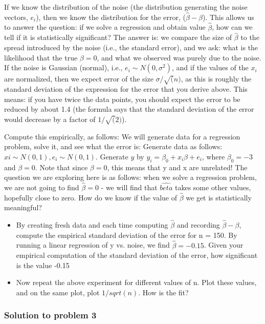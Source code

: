 \documentclass[12pt]{article}%
\begin{document}
If we know the distribution of the noise (the distribution generating the noise vectors, $e_i$), then we know the distribution for the error, ($\hat{\beta} - \beta$). This allows us to answer the question: if we solve a regression and obtain value $\hat{\beta}$, how can we tell if it is statistically significant? The answer is: we compare the size of $\hat{\beta}$ to the spread introduced by the noise (i.e., the standard error), and we ask: what is the likelihood that the true $\beta = 0$, and what we observed was purely due to the noise.\\

If the noise is Gaussian (normal), i.e., $e_i \sim N(0, \sigma^2)$, and if the values of the $x_i$ are normalized, then we expect error of the size $\sigma/\sqrt(n)$, as this is roughly the standard deviation of the expression for the error that you derive above. This means: if you have twice the data points, you should expect the error to be reduced by about 1.4 (the formula says that the standard deviation of the error would decrease by a factor of $1/\sqrt(2)$).

Compute this empirically, as follows: We will generate data for a regression problem, solve it, and see what the error is: Generate data as follows: $xi \sim N(0, 1), e_i \sim N(0, 1)$. Generate $y$ by $y_i = \beta_0 + x_i\beta + e_i$, where $\beta_0 = -3$ and $\beta = 0$. Note that since $\beta = 0$, this means that y and x are unrelated! The question we are exploring here is as follows: when we solve a regression problem, we are not going to find $\hat{\beta} = 0$ - we will find that $\hat{beta}$ takes some other values, hopefully close to zero. How do we know if the value of $\hat{\beta}$ we get is statistically meaningful?
\begin{itemize}
    \item By creating fresh data and each time computing $\hat{\beta}$ and recording $\hat{\beta} - \beta$, compute the empirical standard deviation of the error for n = 150. By running a linear regression of y vs. noise, we find $\hat{\beta} = -0.15$. Given your empirical computation of the standard deviation of the error, how significant is the value -0.15
    \item Now repeat the above experiment for different values of n. Plot these values, and on the same plot, plot $1/sqrt(n)$. How is the fit?
\end{itemize}

\subsubsection{Solution to problem 3}
\end{document}

